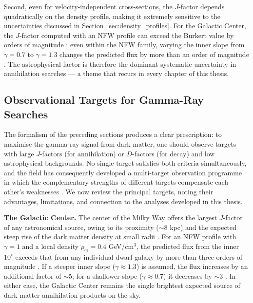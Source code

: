 Second, even for velocity-independent cross-sections, the $J$-factor depends quadratically on the density profile, making it extremely sensitive to the uncertainties discussed in Section~\ref{sec:density_profiles}.
For the Galactic Center, the $J$-factor computed with an NFW profile can exceed the Burkert value by orders of magnitude \cite{Cirelli:2024ssz}; even within the NFW family, varying the inner slope from $\gamma = 0.7$ to $\gamma = 1.3$ changes the predicted flux by more than an order of magnitude \cite{Hooper:2024}.
The astrophysical factor is therefore the dominant systematic uncertainty in annihilation searches --- a theme that recurs in every chapter of this thesis.

\subsection{Observational Targets for Gamma-Ray Searches}
\label{sec:targets}

The formalism of the preceding sections produces a clear prescription: to maximise the gamma-ray signal from dark matter, one should observe targets with large $J$-factors (for annihilation) or $D$-factors (for decay) and low astrophysical backgrounds.
No single target satisfies both criteria simultaneously, and the field has consequently developed a multi-target observation programme in which the complementary strengths of different targets compensate each other's weaknesses \cite{Cirelli:2024ssz}.
We now review the principal targets, noting their advantages, limitations, and connection to the analyses developed in this thesis.

\textbf{The Galactic Center.}
The center of the Milky Way offers the largest $J$-factor of any astronomical source, owing to its proximity ($\sim 8$ kpc) and the expected steep rise of the dark matter density at small radii \cite{Hooper:2024,Pinetti:2021jjs}.
For an NFW profile with $\gamma = 1$ and a local density $\rho_\odot = 0.4$ GeV/cm$^3$, the predicted flux from the inner $10^\circ$ exceeds that from any individual dwarf galaxy by more than three orders of magnitude \cite{Hooper:2024}.
If a steeper inner slope ($\gamma \approx 1.3$) is assumed, the flux increases by an additional factor of $\sim 5$; for a shallower slope ($\gamma \approx 0.7$) it decreases by $\sim 3$ \cite{Hooper:2024}.
In either case, the Galactic Center remains the single brightest expected source of dark matter annihilation products on the sky.

